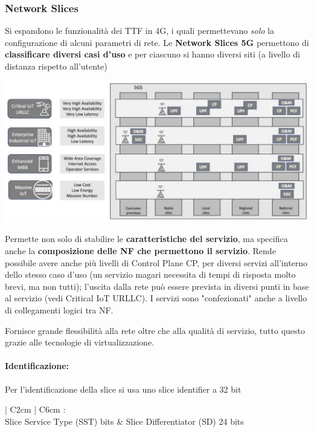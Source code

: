 \subsubsection{Network Slices}

Si espandono le funzionalità dei TTF in 4G, i quali permettevano \textit{solo} la configurazione di alcuni parametri di rete. Le \textbf{Network Slices 5G} permettono di \textbf{classificare diversi casi d'uso} e per ciascuno si hanno diversi siti (a livello di distanza rispetto all'utente)
\begin{center}
	\includegraphics[width=0.97\linewidth]{img/5g/slicing}
\end{center}

Permette non solo di stabilire le \textbf{caratteristiche del servizio}, ma specifica anche la \textbf{composizione delle NF che permettono il servizio}. Rende possibile avere anche più livelli di Control Plane CP, per diversi servizi all'interno dello stesso caso d'uso (un servizio magari necessita di tempi di risposta molto brevi, ma non tutti); l'uscita dalla rete può essere prevista in diversi punti in base al servizio (vedi Critical IoT URLLC). I servizi sono "confezionati" anche a livello di collegamenti logici tra NF.

Fornisce grande flessibilità alla rete oltre che alla qualità di servizio, tutto questo grazie alle tecnologie di virtualizzazione.

\paragraph{Identificazione:} Per l'identificazione della slice si usa uno slice identifier a 32 bit
\begin{center}
	\begin{tabular}{| C{2cm} | C{6cm} :}
		 \\
		 
		Slice Service Type (SST)  bits & Slice Differentiator (SD) 24 bits \\
		 
	\end{tabular}
\end{center}

